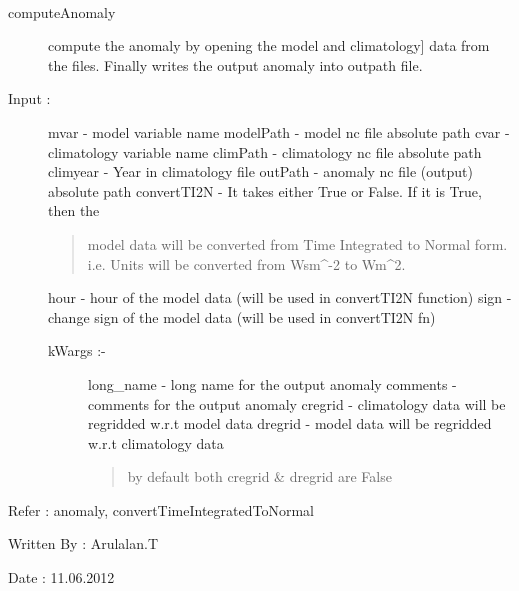 \documentclass[letterpaper,10pt,english]{sphinxmanual}
\begin{document}
\begin{fulllineitems}
\label{mjo:variance_utils.computeAnomaly}~\begin{description}
\item[{computeAnomaly}] \leavevmode{[}compute the anomaly by opening the model and climatology{]}
data from the files. Finally writes the output anomaly into outpath
file.

\item[{Input :}] \leavevmode
mvar - model variable name
modelPath - model nc file absolute path
cvar - climatology variable name
climPath - climatology nc file absolute path
climyear - Year in climatology file
outPath - anomaly nc file (output) absolute path
convertTI2N - It takes either True or False. If it is True, then the
\begin{quote}

model data will be converted from Time Integrated to Normal form.
i.e. Units will be converted from Wsm\textasciicircum{}-2 to Wm\textasciicircum{}2.
\end{quote}

hour - hour of the model data (will be used in convertTI2N function)
sign - change sign of the model data (will be used in convertTI2N fn)
\begin{description}
\item[{kWargs :-}] \leavevmode
long\_name - long name for the output anomaly
comments - comments for the output anomaly
cregrid - climatology data will be regridded w.r.t model data
dregrid - model data will be regridded w.r.t climatology data
\begin{quote}

by default both cregrid \& dregrid are False
\end{quote}

\end{description}

\end{description}

Refer : anomaly, convertTimeIntegratedToNormal

Written By : Arulalan.T

Date : 11.06.2012

\end{fulllineitems}
\end{document}
